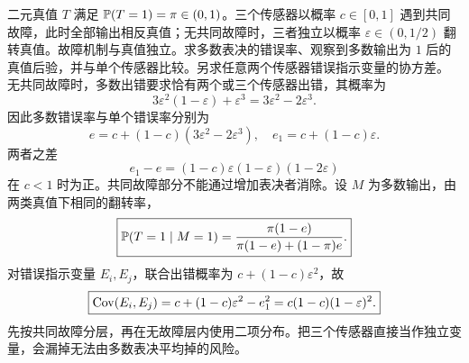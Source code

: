 二元真值 $T$ 满足 $\mathbb{P}(T=1)=\pi\in(0,1)$。三个传感器以概率 $c\in[0,1]$ 遇到共同故障，此时全部输出相反真值；无共同故障时，三者独立以概率 $\varepsilon\in(0,1/2)$ 翻转真值。故障机制与真值独立。求多数表决的错误率、观察到多数输出为 $1$ 后的真值后验，并与单个传感器比较。另求任意两个传感器错误指示变量的协方差。
\solution 无共同故障时，多数出错要求恰有两个或三个传感器出错，其概率为
\[
3\varepsilon^2(1-\varepsilon)+\varepsilon^3
=3\varepsilon^2-2\varepsilon^3.
\]
因此多数错误率与单个错误率分别为
\[
e=c+(1-c)(3\varepsilon^2-2\varepsilon^3),\quad
e_1=c+(1-c)\varepsilon.
\]
两者之差
\[
e_1-e=(1-c)\varepsilon(1-\varepsilon)(1-2\varepsilon)
\]
在 $c<1$ 时为正。共同故障部分不能通过增加表决者消除。设 $M$ 为多数输出，由两类真值下相同的翻转率，
\[
\boxed{\mathbb{P}(T=1\mid M=1)=
\frac{\pi(1-e)}{\pi(1-e)+(1-\pi)e}.}
\]
对错误指示变量 $E_i,E_j$，联合出错概率为 $c+(1-c)\varepsilon^2$，故
\[
\boxed{\operatorname{Cov}(E_i,E_j)=c+(1-c)\varepsilon^2-e_1^2
=c(1-c)(1-\varepsilon)^2.}
\]
\insight 先按共同故障分层，再在无故障层内使用二项分布。把三个传感器直接当作独立变量，会漏掉无法由多数表决平均掉的风险。
